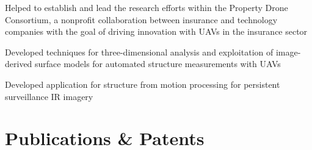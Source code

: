 \documentclass[]{nilosek-resume}
\begin{document}
\begin{minipage}[t]{0.7\textwidth}
\begin{tightemize}
	\item Helped to establish and lead the research efforts within the Property Drone Consortium, a nonprofit collaboration between insurance and technology companies with the goal of driving innovation with UAVs in the insurance sector
	\item Developed techniques for three-dimensional analysis and exploitation of image-derived surface models for automated structure measurements with UAVs
\end{tightemize}
\sectionsep

\begin{tightemize}
	\item Developed application for structure from motion processing for persistent surveillance IR imagery
\end{tightemize}


\section{Publications \& Patents}
\renewcommand\refname{\vskip - 0.8cm} %


\nocite{*}


\end{minipage} 
\end{document}
